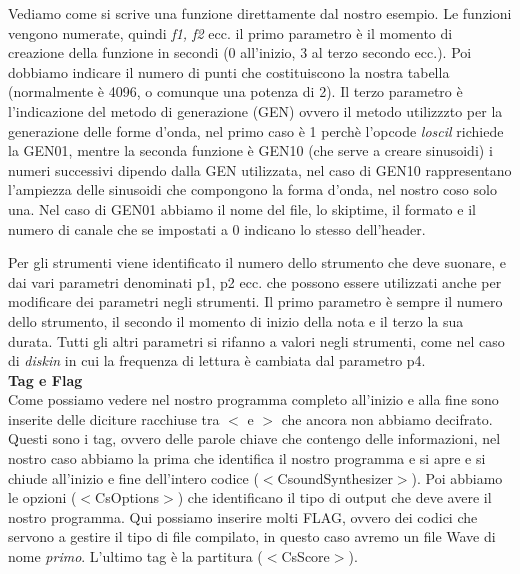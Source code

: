 \documentclass[11pt]{article}
\begin{document}
\begin{multicols*}{2}
\begin{center}
\begin{minipage}[c]{6.2cm}
\begin{sffamily}
\end{sffamily}
\end{minipage}
\end{center}

Vediamo come si scrive una funzione direttamente dal nostro esempio. Le funzioni vengono numerate, quindi \textit{f1, f2} ecc. il primo parametro è il momento di creazione della funzione in secondi (0 all'inizio, 3 al terzo secondo ecc.). Poi dobbiamo indicare il numero di punti che costituiscono la nostra tabella (normalmente è 4096, o comunque una potenza di 2). Il terzo parametro è l'indicazione del metodo di generazione (GEN) ovvero il metodo utilizzzto per la generazione delle forme d'onda, nel primo caso è 1 perchè l'opcode \textit{loscil} richiede la GEN01, mentre la seconda funzione è GEN10 (che serve a creare sinusoidi) i numeri successivi dipendo dalla GEN utilizzata, nel caso di GEN10 rappresentano l'ampiezza delle sinusoidi che compongono la forma d'onda, nel nostro coso solo una. Nel caso di GEN01 abbiamo il nome del file, lo skiptime, il formato e il numero di canale che se impostati a 0 indicano lo stesso dell'header.

Per gli strumenti viene identificato il numero dello strumento che deve suonare, e dai vari parametri denominati p1, p2 ecc. che possono essere utilizzati anche per modificare dei parametri negli strumenti. Il primo parametro è sempre il numero dello strumento, il secondo il momento di inizio della nota e il terzo la sua durata. Tutti gli altri parametri si rifanno a valori negli strumenti, come nel caso di \textit{diskin} in cui la frequenza di lettura è cambiata dal parametro p4. \\

\textbf{\textsf {Tag e Flag}}\\

Come possiamo vedere nel nostro programma completo all'inizio e alla fine sono inserite delle diciture racchiuse tra $<$ e $>$ che ancora non abbiamo decifrato. Questi sono i tag, ovvero delle parole chiave che contengo delle informazioni, nel nostro caso abbiamo la prima che identifica il nostro programma e si apre e si chiude all'inizio e fine dell'intero codice ($<$CsoundSynthesizer$>$). Poi abbiamo le opzioni ($<$CsOptions$>$) che identificano il tipo di output che deve avere il nostro programma. Qui possiamo inserire molti FLAG, ovvero dei codici che servono a gestire il tipo di file compilato, in questo caso avremo un file Wave di nome \textit{primo}. L'ultimo tag è la partitura ($<$CsScore$>$).


\end{multicols*}
\end{document}
